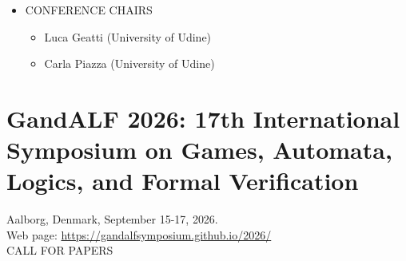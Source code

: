 \documentclass[prodmode,acmtecs]{acmsmall} %
\begin{document}
\begin{itemize}
  Senior (faculty members: professors and researchers):        350 EUR 
 
\begin{itemize}\item  Late registration fees:
\end{itemize} 
  Junior (non-faculty members: PhD students, post-docs, etc.): 350 EUR 
 
  Senior (faculty members: professors and researchers):        420 EUR 
 
\item  CONFERENCE CHAIRS 
 
\begin{itemize}\item  Luca Geatti (University of Udine)
\item  Carla Piazza (University of Udine)
\end{itemize} 
\end{itemize}\section{GandALF 2026: 17th International Symposium on Games, Automata, Logics, and Formal Verification }\label{GandALF2026}  Aalborg, Denmark, September 15-17, 2026.\\ 
  Web page: \href{https://gandalfsymposium.github.io/2026/}{https://gandalfsymposium.github.io/2026/}\\ 
CALL FOR PAPERS  
\end{document}
